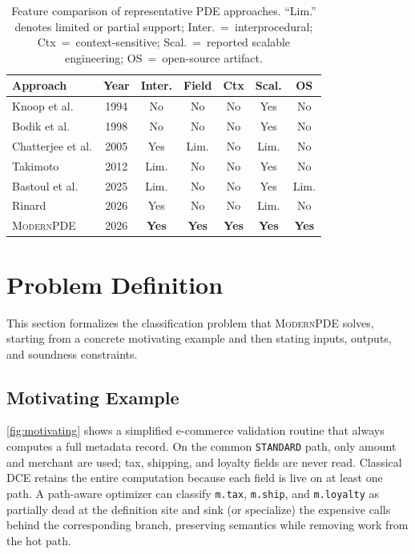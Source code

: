 \documentclass[acmsmall,screen,review,anonymous]{acmart}
\begin{document}
\begin{table}[t]
\centering\small
\caption{Feature comparison of representative PDE approaches. ``Lim.'' denotes limited or partial support; Inter.\ =\ interprocedural; Ctx\ =\ context-sensitive; Scal.\ =\ reported scalable engineering; OS\ =\ open-source artifact.}
\label{tab:comparison}
\begin{tabular}{lcccccc}
\toprule
\textbf{Approach} & \textbf{Year} & \textbf{Inter.} & \textbf{Field} & \textbf{Ctx} & \textbf{Scal.} & \textbf{OS} \\
\midrule
Knoop et al. & 1994 & No & No & No & Yes & No \\
Bodik et al. & 1998 & No & No & No & Yes & No \\
Chatterjee et al. & 2005 & Yes & Lim. & No & Lim. & No \\
Takimoto & 2012 & Lim. & No & No & Yes & No \\
Bastoul et al. & 2025 & Lim. & No & No & Yes & Lim. \\
Rinard & 2026 & Yes & No & No & Lim. & No \\
\textsc{ModernPDE} & 2026 & \textbf{Yes} & \textbf{Yes} & \textbf{Yes} & \textbf{Yes} & \textbf{Yes} \\
\bottomrule
\end{tabular}
\end{table}
\section{Problem Definition}
\label{sec:problem}
This section formalizes the classification problem that \textsc{ModernPDE} solves, starting from a concrete motivating example and then stating inputs, outputs, and soundness constraints.

\subsection{Motivating Example}
\autoref{fig:motivating} shows a simplified e-commerce validation routine that always computes a full metadata record. On the common \texttt{STANDARD} path, only amount and merchant are used; tax, shipping, and loyalty fields are never read. Classical DCE retains the entire computation because each field is live on at least one path. A path-aware optimizer can classify \texttt{m.tax}, \texttt{m.ship}, and \texttt{m.loyalty} as partially dead at the definition site and sink (or specialize) the expensive calls behind the corresponding branch, preserving semantics while removing work from the hot path.
\end{document}
